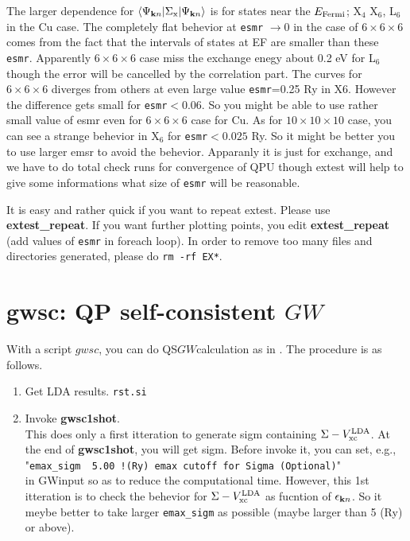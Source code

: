 \documentclass[a4paper,10pt,epsf,fleqn]{article}
\newcommand{\GW}{$GW$}
\newcommand{\bfk}{{\bf k}}
\newcommand{\exe}[1]{{\bf #1}}
\newcommand{\io}[1]{{\sf  #1}}
\newcommand{\raw}[1]{{\tt #1}}
\begin{document}
{{{The larger dependence for $\langle \Psi_{{\bf k} n} |\Sigma_{\rm x}| \Psi_{{\bf k} n}\rangle$ 
is for states near the $E_{\rm Fermi}$; X$_4$ X$_6$, L$_6$ in the Cu case. 
The completely flat behevior at {\tt esmr} $\to 0$ in the case of $6\times6\times6$ comes from
the fact that the intervals of states at EF are smaller than these {\tt esmr}. 
Apparently $6\times6\times6$ case miss the exchange enegy about 0.2 eV for L$_6$
though the error will be cancelled by the correlation part.
The curves for $6\times6\times6$ diverges from others at even large value {\tt esmr}=0.25 Ry in X6. 
However the difference gets small for {\tt esmr}$<0.06$. So you might be able 
to use rather small value of esmr even for $6\times6\times6$ case for Cu.
As for $10\times10\times10$ case, you can see a strange behevior in X$_6$ for {\tt esmr}$<0.025$ Ry.
So it might be better you to use larger emsr to avoid the behevior.
Apparanly it is just for exchange, and we have to do total check runs
for convergence of QPU though extest will help to give some informations
what size of {\tt esmr} will be reasonable.

It is easy and rather quick if you want to repeat extest. 
Please use {\bf extest\_repeat}.
If you want further plotting points, you edit {\bf extest\_repeat} 
(add values of {\tt esmr} in foreach loop).
In order to remove too many files and directories generated, please do \verb|rm -rf EX*|.




\section{\exe{gwsc}: QP self-consistent \GW}
\label{scgw}

With a script $gwsc$, you can do QS\GW calculation
as in \cite{scgw03}.
The procedure is as follows.
\begin{enumerate}
\item Get LDA results. \raw{rst.si}

\item Invoke \exe{gwsc1shot}.\\
This does only a first itteration to generate \io{sigm}
containing $\Sigma -V_{\rm xc}^{\rm LDA}$.
At the end of \exe{gwsc1shot}, you will get \io{sigm}.
Before invoke it, you can set, e.g.,\\
"\verb#emax_sigm  5.00 !(Ry) emax cutoff for Sigma (Optional)#"\\
in \io{GWinput} so as to reduce the computational time.
However, this 1st itteration is to check the behevior for
$\Sigma -V_{\rm xc}^{\rm LDA}$ as fucntion of $\epsilon_{\bfk n}$.
So it meybe better to take larger \verb#emax_sigm# as possible 
(maybe larger than 5 (Ry) or above).



\end{enumerate}}}}
\end{document}

